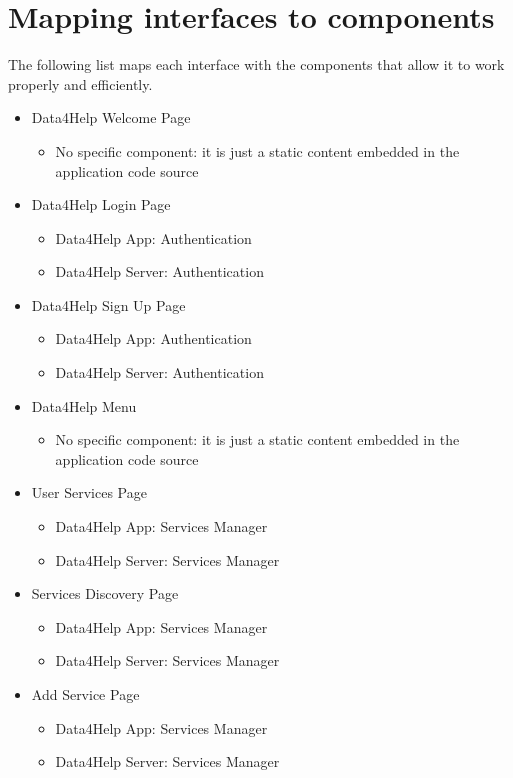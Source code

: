 \documentclass[../DD.tex]{subfiles}
\begin{document}
	\section{Mapping interfaces to components}
	The following list maps each interface with the components that allow it to work properly and efficiently.
	\begin{itemize}
		\item Data4Help Welcome Page
			\begin{itemize}\item{No specific component: it is just a static content embedded in the application code source}\end{itemize}
		\item Data4Help Login Page
			\begin{itemize}\item{Data4Help App: Authentication}\item{Data4Help Server: Authentication}\end{itemize}
		\item Data4Help Sign Up Page
			\begin{itemize}\item{Data4Help App: Authentication}\item{Data4Help Server: Authentication}\end{itemize}
		\item Data4Help Menu
			\begin{itemize}\item{No specific component: it is just a static content embedded in the application code source}\end{itemize}
		\item User Services Page	
			\begin{itemize}\item{Data4Help App: Services Manager} \item{Data4Help Server: Services Manager}\end{itemize}	
		\item Services Discovery Page			
			\begin{itemize}\item{Data4Help App: Services Manager} \item{Data4Help Server: Services Manager}\end{itemize}	
		\item Add Service Page
			\begin{itemize}\item{Data4Help App: Services Manager} \item{Data4Help Server: Services Manager}\end{itemize}

\end{itemize}
\end{document}
